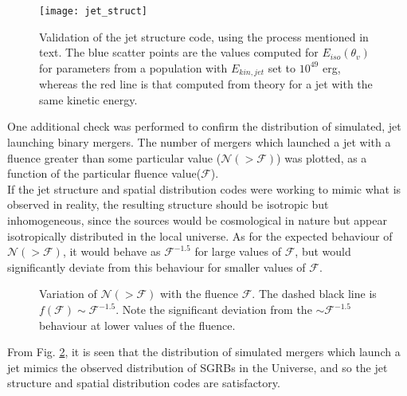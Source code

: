     \begin{figure}[H]
        \centering
        \texttt{[image: jet\_struct]}
        \caption[Validation of the jet structure code]
        {
            Validation of the jet structure code, using the process mentioned in text.
            The blue scatter points are the values computed for $E_{iso}(\theta_v)$ for
            parameters from a population with $E_{kin, jet}$ set to $10^{49}$ erg,
            whereas the red line is that computed from theory for a jet with the same
            kinetic energy.
        }
        \label{fig:jet_struct}
    \end{figure}

    One additional check was performed to confirm the distribution of simulated, jet
    launching binary mergers. The number of mergers which launched a jet with a fluence
    greater than some particular value ($\mathcal{N}(>\mathcal{F})$) was plotted, as a
    function of the particular fluence value($\mathcal{F}$).\\
    If the jet structure and spatial distribution codes were working to mimic what is
    observed in reality, the resulting structure should be isotropic but inhomogeneous,
    since the sources would be cosmological in nature but appear isotropically
    distributed in the local universe. As for the expected behaviour of $\mathcal{N}(>
    \mathcal{F})$, it would behave as $\mathcal{F}^{-1.5}$ for large values of
    $\mathcal{F}$, but would significantly deviate from this behaviour
    for smaller values of $\mathcal{F}$.

    \begin{figure}[H]
        \centering
        \def\svgwidth{0.9\linewidth}
        
        \caption[Variation of $\mathcal{N}(> \mathcal{F})$ with $\mathcal{F}$]{
            Variation of $\mathcal{N}(> \mathcal{F})$ with the fluence $\mathcal{F}$.
            The dashed black line is $f(\mathcal{F}) \sim \mathcal{F}^{-1.5}$. Note the
            significant deviation from the $\sim \mathcal{F}^{-1.5}$ behaviour at lower
            values of the fluence.
        }
        \label{fig:number_fluence}
    \end{figure}

    From Fig. \ref{fig:number_fluence}, it is seen that the distribution of simulated
    mergers which launch a jet mimics the observed distribution of SGRBs in the
    Universe, and so the jet structure and spatial distribution codes are satisfactory.

